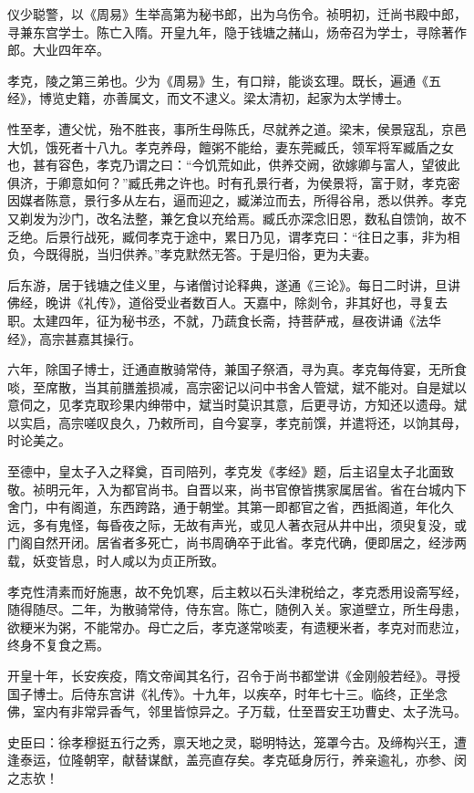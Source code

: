 \documentclass[]{article}
\begin{document}
仪少聪警，以《周易》生举高第为秘书郎，出为乌伤令。祯明初，迁尚书殿中郎，寻兼东宫学士。陈亡入隋。开皇九年，隐于钱塘之赭山，炀帝召为学士，寻除著作郎。大业四年卒。

孝克，陵之第三弟也。少为《周易》生，有口辩，能谈玄理。既长，遍通《五经》，博览史籍，亦善属文，而文不逮义。梁太清初，起家为太学博士。

性至孝，遭父忧，殆不胜丧，事所生母陈氏，尽就养之道。梁末，侯景寇乱，京邑大饥，饿死者十八九。孝克养母，饘粥不能给，妻东莞臧氏，领军将军臧盾之女也，甚有容色，孝克乃谓之曰：``今饥荒如此，供养交阙，欲嫁卿与富人，望彼此俱济，于卿意如何？''臧氏弗之许也。时有孔景行者，为侯景将，富于财，孝克密因媒者陈意，景行多从左右，逼而迎之，臧涕泣而去，所得谷帛，悉以供养。孝克又剃发为沙门，改名法整，兼乞食以充给焉。臧氏亦深念旧恩，数私自馈饷，故不乏绝。后景行战死，臧伺孝克于途中，累日乃见，谓孝克曰：``往日之事，非为相负，今既得脱，当归供养。''孝克默然无答。于是归俗，更为夫妻。

后东游，居于钱塘之佳义里，与诸僧讨论释典，遂通《三论》。每日二时讲，旦讲佛经，晚讲《礼传》，道俗受业者数百人。天嘉中，除剡令，非其好也，寻复去职。太建四年，征为秘书丞，不就，乃蔬食长斋，持菩萨戒，昼夜讲诵《法华经》，高宗甚嘉其操行。

六年，除国子博士，迁通直散骑常侍，兼国子祭酒，寻为真。孝克每侍宴，无所食啖，至席散，当其前膳羞损减，高宗密记以问中书舍人管斌，斌不能对。自是斌以意伺之，见孝克取珍果内绅带中，斌当时莫识其意，后更寻访，方知还以遗母。斌以实启，高宗嗟叹良久，乃敕所司，自今宴享，孝克前馔，并遣将还，以饷其母，时论美之。

至德中，皇太子入之释奠，百司陪列，孝克发《孝经》题，后主诏皇太子北面致敬。祯明元年，入为都官尚书。自晋以来，尚书官僚皆携家属居省。省在台城内下舍门，中有阁道，东西跨路，通于朝堂。其第一即都官之省，西抵阁道，年化久远，多有鬼怪，每昏夜之际，无故有声光，或见人著衣冠从井中出，须臾复没，或门阁自然开闭。居省者多死亡，尚书周确卒于此省。孝克代确，便即居之，经涉两载，妖变皆息，时人咸以为贞正所致。

孝克性清素而好施惠，故不免饥寒，后主敕以石头津税给之，孝克悉用设斋写经，随得随尽。二年，为散骑常侍，侍东宫。陈亡，随例入关。家道壁立，所生母患，欲粳米为粥，不能常办。母亡之后，孝克遂常啖麦，有遗粳米者，孝克对而悲泣，终身不复食之焉。

开皇十年，长安疾疫，隋文帝闻其名行，召令于尚书都堂讲《金刚般若经》。寻授国子博士。后侍东宫讲《礼传》。十九年，以疾卒，时年七十三。临终，正坐念佛，室内有非常异香气，邻里皆惊异之。子万载，仕至晋安王功曹史、太子洗马。

史臣曰：徐孝穆挺五行之秀，禀天地之灵，聪明特达，笼罩今古。及缔构兴王，遭逢泰运，位隆朝宰，献替谋猷，盖亮直存矣。孝克砥身厉行，养亲逾礼，亦参、闵之志欤！
\end{document}
